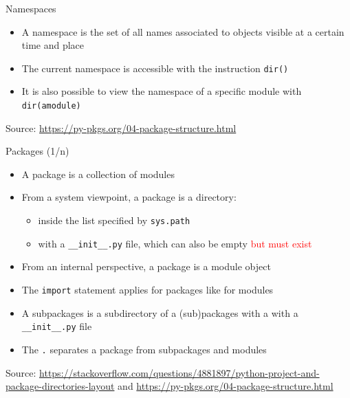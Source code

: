 \documentclass{beamer}
\begin{document}
\begin{frame}[fragile]
{\centerline{Namespaces}}
\begin{itemize}
	 \item A namespace is the set of all names associated to objects visible at a certain time and place
	 \item The current namespace is accessible with the instruction \texttt{dir()}
	 \item It is also possible to view the namespace of a specific module with \texttt{dir(amodule)}
 \end{itemize}
    \begin{center}
	\tiny Source: \url{https://py-pkgs.org/04-package-structure.html}
    \end{center}
\end{frame}

\begin{frame}[fragile]
{\centerline{Packages (1/n)}}
\begin{itemize}
	 \item A package is a collection of modules
	 \item From a system viewpoint, a package is a directory:
	\begin{itemize}
		 \item inside the list specified by \texttt{sys.path}
		 \item with a \texttt{\_\_init\_\_.py} file, which can also be empty \textcolor{red}{but must exist}
	 \end{itemize}
	 \item From an internal perspective, a package is a module object
	 \item The \texttt{import} statement applies for packages like for modules
	 \item A subpackages is a subdirectory of a (sub)packages with a  with a \texttt{\_\_init\_\_.py} file
	 \item The \texttt{.} separates a package from subpackages and modules
	 
 \end{itemize}
    \begin{center}
	\tiny Source: \url{https://stackoverflow.com/questions/4881897/python-project-and-package-directories-layout} and \url{https://py-pkgs.org/04-package-structure.html}
    \end{center}
\end{frame}
\end{document}

